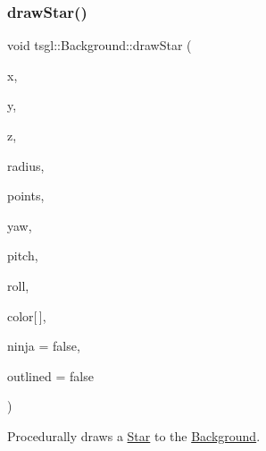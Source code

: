 \subsubsection{\texorpdfstring{draw\+Star()}{drawStar()}\hspace{0.1cm}{\footnotesize\ttfamily [2/2]}}
{\footnotesize\ttfamily void tsgl\+::\+Background\+::draw\+Star (\begin{DoxyParamCaption}\item[{float}]{x,  }\item[{float}]{y,  }\item[{float}]{z,  }\item[{float}]{radius,  }\item[{int}]{points,  }\item[{float}]{yaw,  }\item[{float}]{pitch,  }\item[{float}]{roll,  }\item[{\hyperlink{structtsgl_1_1_color_float}{Color\+Float}}]{color\mbox{[}$\,$\mbox{]},  }\item[{bool}]{ninja = {\ttfamily false},  }\item[{bool}]{outlined = {\ttfamily false} }\end{DoxyParamCaption})\hspace{0.3cm}{\ttfamily [virtual]}}



Procedurally draws a \hyperlink{classtsgl_1_1_star}{Star} to the \hyperlink{classtsgl_1_1_background}{Background}. 

